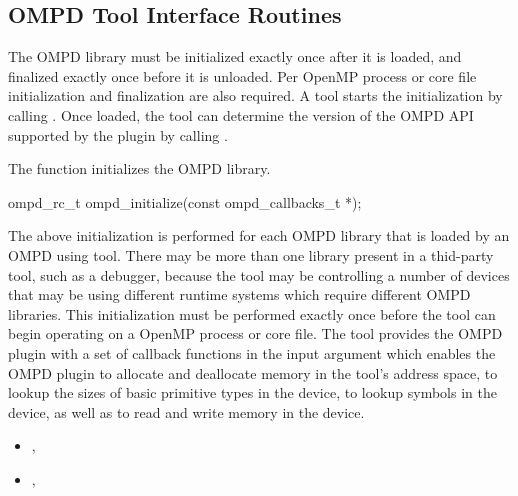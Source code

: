 
\subsection{OMPD Tool Interface Routines}
\label{sec:ompd-api}


The OMPD library must be initialized exactly once after it is loaded, and finalized exactly once
before it is unloaded. Per OpenMP process or core file initialization and finalization are also required. 
A tool starts the initialization by calling . Once loaded, the 
tool can determine the version of the OMPD API supported by the plugin by 
calling .

\label{ompd:ompd_initialize}

\summary
The  function initializes the OMPD library.

\format

\begin{cspecific}
\begin{ompSyntax}
ompd_rc_t ompd_initialize(const ompd_callbacks_t *);
\end{ompSyntax}
\end{cspecific}

\descr
The above initialization is performed for each OMPD library that is loaded by an OMPD using tool. 
There may be more than one library present in a thid-party tool, such as a debugger, because the tool 
may be controlling a number of devices that may be using different runtime systems which require 
different OMPD libraries. This initialization must be performed exactly once before the tool
can begin operating on a OpenMP process or core file.
\argdesc
The tool provides the OMPD plugin with a set of callback functions in the  input argument
which enables the OMPD plugin to allocate and deallocate memory in the tool's address space, to lookup the 
sizes of basic primitive types in the device, to lookup symbols in the device, as well as to read and 
write memory in the device.

\crossreferences
\begin{itemize}
	\item
	, 
	\item
	, 
\end{itemize}

